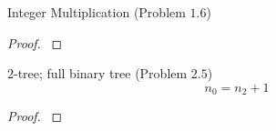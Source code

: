 \begin{frame}{}
  \begin{exampleblock}{Integer Multiplication (Problem $1.6$)}
    
  \end{exampleblock}
  
  \pause
  \begin{proof}
    \centerline{}
  \end{proof}
\end{frame}

\begin{frame}{}
  \begin{exampleblock}{$2$-tree; full binary tree (Problem $2.5$)}
    \[
      n_0 = n_2 + 1
    \]
  \end{exampleblock}

  \vspace{0.50cm}
  \begin{proof}
    \pause
    \centerline{}
  \end{proof}
\end{frame}
